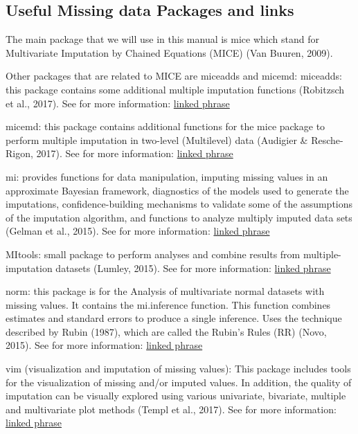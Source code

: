 \documentclass[]{book}
\theoremstyle{definition}
\theoremstyle{definition}
\theoremstyle{definition}
\theoremstyle{remark}
\begin{document}
\subsection{Useful Missing data Packages and
links}\label{useful-missing-data-packages-and-links}

The main package that we will use in this manual is mice which stand for
Multivariate Imputation by Chained Equations (MICE) (Van Buuren, 2009).

Other packages that are related to MICE are miceadds and micemd:
miceadds: this package contains some additional multiple imputation
functions (Robitzsch et al., 2017). See for more information:
\href{https://cran.r-project.org/web/packages/miceadds/index.html}{linked
phrase}

micemd: this package contains additional functions for the mice package
to perform multiple imputation in two-level (Multilevel) data (Audigier
\& Resche-Rigon, 2017). See for more information:
\href{https://cran.r-project.org/web/packages/micemd/index.html}{linked
phrase}

mi: provides functions for data manipulation, imputing missing values in
an approximate Bayesian framework, diagnostics of the models used to
generate the imputations, confidence-building mechanisms to validate
some of the assumptions of the imputation algorithm, and functions to
analyze multiply imputed data sets (Gelman et al., 2015). See for more
information:
\href{https://cran.r-project.org/web/packages/mi/index.html}{linked
phrase}

MItools: small package to perform analyses and combine results from
multiple-imputation datasets (Lumley, 2015). See for more information:
\href{https://cran.r-project.org/web/packages/mitools/index.html}{linked
phrase}

norm: this package is for the Analysis of multivariate normal datasets
with missing values. It contains the mi.inference function. This
function combines estimates and standard errors to produce a single
inference. Uses the technique described by Rubin (1987), which are
called the Rubin's Rules (RR) (Novo, 2015). See for more information:
\href{https://cran.r-project.org/web/packages/norm/index.html}{linked
phrase}

vim (visualization and imputation of missing values): This package
includes tools for the visualization of missing and/or imputed values.
In addition, the quality of imputation can be visually explored using
various univariate, bivariate, multiple and multivariate plot methods
(Templ et al., 2017). See for more information:
\href{https://cran.r-project.org/web/packages/mi/index.html}{linked
phrase}
\end{document}
